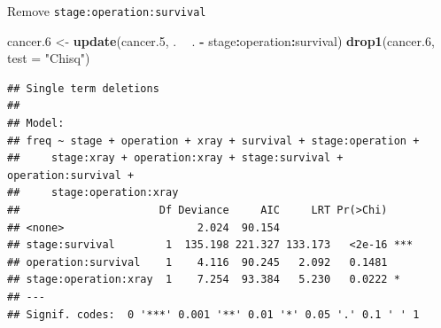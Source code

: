 \documentclass[ignorenonframetext,]{beamer}
\newenvironment{Shaded}{\begin{snugshade}}{\end{snugshade}}
\newcommand{\DataTypeTok}[1]{\textcolor[rgb]{0.13,0.29,0.53}{#1}}
\newcommand{\FloatTok}[1]{\textcolor[rgb]{0.00,0.00,0.81}{#1}}
\newcommand{\KeywordTok}[1]{\textcolor[rgb]{0.13,0.29,0.53}{\textbf{#1}}}
\newcommand{\NormalTok}[1]{#1}
\newcommand{\OperatorTok}[1]{\textcolor[rgb]{0.81,0.36,0.00}{\textbf{#1}}}
\newcommand{\StringTok}[1]{\textcolor[rgb]{0.31,0.60,0.02}{#1}}
\begin{document}
\begin{frame}[fragile]{Remove \texttt{stage:operation:survival}}
\protect\hypertarget{remove-stageoperationsurvival}{}

\scriptsize

\begin{Shaded}
\begin{Highlighting}[]
\NormalTok{cancer}\FloatTok{.6}\NormalTok{ <-}\StringTok{ }\KeywordTok{update}\NormalTok{(cancer}\FloatTok{.5}\NormalTok{, . }\OperatorTok{~}\StringTok{ }\NormalTok{. }\OperatorTok{-}\StringTok{ }\NormalTok{stage}\OperatorTok{:}\NormalTok{operation}\OperatorTok{:}\NormalTok{survival)}
\KeywordTok{drop1}\NormalTok{(cancer}\FloatTok{.6}\NormalTok{, }\DataTypeTok{test =} \StringTok{"Chisq"}\NormalTok{)}
\end{Highlighting}
\end{Shaded}

\begin{verbatim}
## Single term deletions
## 
## Model:
## freq ~ stage + operation + xray + survival + stage:operation + 
##     stage:xray + operation:xray + stage:survival + operation:survival + 
##     stage:operation:xray
##                      Df Deviance     AIC     LRT Pr(>Chi)    
## <none>                     2.024  90.154                     
## stage:survival        1  135.198 221.327 133.173   <2e-16 ***
## operation:survival    1    4.116  90.245   2.092   0.1481    
## stage:operation:xray  1    7.254  93.384   5.230   0.0222 *  
## ---
## Signif. codes:  0 '***' 0.001 '**' 0.01 '*' 0.05 '.' 0.1 ' ' 1
\end{verbatim}

\normalsize

\end{frame}
\end{document}
